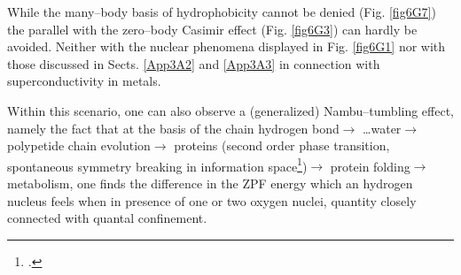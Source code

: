 \begin{subappendices}
While the many--body basis of hydrophobicity cannot be denied (Fig. \ref{fig6G7}) the parallel with the zero--body Casimir effect (Fig. \ref{fig6G3}) can hardly be avoided. Neither with the nuclear phenomena displayed in Fig. \ref{fig6G1} nor with those discussed in Sects. \ref{App3A2} and \ref{App3A3} in connection with superconductivity in metals.


Within this scenario, one can also observe a (generalized) Nambu--tumbling effect, namely the fact that at the basis of the chain hydrogen bond$\to$ \dots water$\to$ polypetide chain evolution$\to$ proteins (second order phase transition, spontaneous symmetry breaking in information space\footnote{\cite{Broglia:13b}.})$\to$ protein folding$\to$ metabolism,  one finds the difference in the ZPF energy which an hydrogen nucleus feels when in presence of one or two oxygen nuclei, quantity closely connected with quantal confinement.
 




\end{subappendices}
\renewcommand{\bibname}{Bibliography Ch 6}

%
 